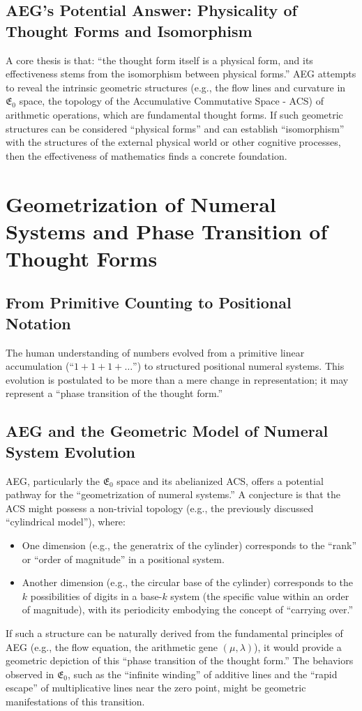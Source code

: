 \documentclass{article}
\begin{document}
\subsection{AEG's Potential Answer: Physicality of Thought Forms and Isomorphism}
A core thesis is that: ``the thought form itself is a physical form, and its effectiveness stems from the isomorphism between physical forms.''
AEG attempts to reveal the intrinsic geometric structures (e.g., the flow lines and curvature in $\mathfrak{E}_0$ space, the topology of the Accumulative Commutative Space - ACS) of arithmetic operations, which are fundamental thought forms. If such geometric structures can be considered ``physical forms'' and can establish ``isomorphism'' with the structures of the external physical world or other cognitive processes, then the effectiveness of mathematics finds a concrete foundation.

\section{Geometrization of Numeral Systems and Phase Transition of Thought Forms}

\subsection{From Primitive Counting to Positional Notation}
The human understanding of numbers evolved from a primitive linear accumulation (``$1+1+1+\dots$'') to structured positional numeral systems. This evolution is postulated to be more than a mere change in representation; it may represent a ``phase transition of the thought form.''

\subsection{AEG and the Geometric Model of Numeral System Evolution}
AEG, particularly the $\mathfrak{E}_0$ space and its abelianized ACS, offers a potential pathway for the ``geometrization of numeral systems.''
A conjecture is that the ACS might possess a non-trivial topology (e.g., the previously discussed ``cylindrical model''), where:
\begin{itemize}
    \item One dimension (e.g., the generatrix of the cylinder) corresponds to the ``rank'' or ``order of magnitude'' in a positional system.
    \item Another dimension (e.g., the circular base of the cylinder) corresponds to the $k$ possibilities of digits in a base-$k$ system (the specific value within an order of magnitude), with its periodicity embodying the concept of ``carrying over.''
\end{itemize}
If such a structure can be naturally derived from the fundamental principles of AEG (e.g., the flow equation, the arithmetic gene $(\mu, \lambda)$), it would provide a geometric depiction of this ``phase transition of the thought form.'' The behaviors observed in $\mathfrak{E}_0$, such as the ``infinite winding'' of additive lines and the ``rapid escape'' of multiplicative lines near the zero point, might be geometric manifestations of this transition.
\end{document}
